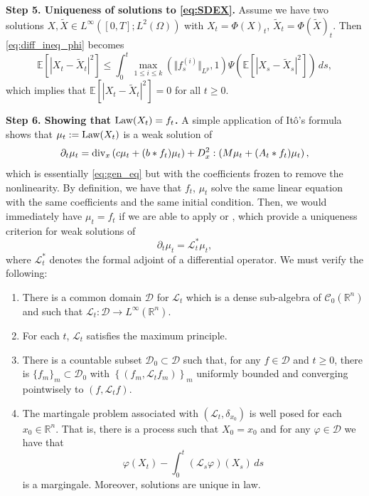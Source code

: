\documentclass[10pt,oneside]{amsart}
\numberwithin{equation}{section}
\numberwithin{definition}{section}
\numberwithin{theorem}{section}
\numberwithin{lemma}{section}
\begin{document}
\textbf{Step 5. Uniqueness of solutions to \cref{eq:SDEX}.} Assume we have two solutions $X,\tilde{X}\in L^{\infty}\left([0,T];L^{2}(\Omega)\right)$ with $X_{t}=\Phi(X)_{t}$, $\tilde{X}_{t}=\Phi(\tilde{X})_{t}$. Then \cref{eq:diff_ineq_phi} becomes
%
\begin{equation*}
  \mathbb{E}\left[|X_{t}-\tilde{X}_{t}|^{2}\right]\leq\int_{0}^{t}\max_{1\leq i\leq k}(\Vert f_{s}^{(i)}\Vert_{L^p},1)\Psi\left(\mathbb{E}\left[|X_{s}-\tilde{X}_{s}|^{2}\right]\right)\,ds,
\end{equation*}
%
which implies that $\mathbb{E}\left[|X_{t}-\tilde{X}_{t}|^{2}\right]=0$ for all $t\geq0$.

\textbf{Step 6. Showing that $\textnormal{Law}(X_t)=f_t$.} A simple application of Itô's formula shows that $\mu_{t}:=\textnormal{Law}(X_{t})$ is a weak solution of
%
\begin{equation*}
  \partial_{t}\mu_{t}=\textnormal{div}_{x}\left(c\mu_{t}+(b*f_{t})\mu_{t}\right)+D_{x}^{2}:\left(M\mu_{t}+(A_{t}*f_{t})\mu_{t}\right),
\end{equation*}
%
which is essentially \cref{eq:gen_eq} but with the coefficients frozen to remove the nonlinearity. By definition, we have that $f_t$, $\mu_t$ solve the same linear equation with the same coefficients and the same initial condition. Then, we would immediately have $\mu_t = f_t$ if we are able to apply \cite[Theorem B.1]{HoroKara1990MartProbBoltz} or \cite[Theorems 4.1 and 5.1]{BhattKara1993InvarMeasures}, which provide a uniqueness criterion for weak solutions of
%
\begin{equation*}
  \partial_t \mu_t = \mathcal L_t^*\mu_t,
\end{equation*}
%
where $\mathcal L_t^*$ denotes the formal adjoint of a differential operator. We must verify the following:
\begin{enumerate}
  \item There is a common domain $\mathcal D$ for $\mathcal L_t$ which is a dense sub-algebra of $\mathcal C_0(\mathbb R^n)$ and such that $\mathcal L_t : \mathcal D\longrightarrow L^\infty(\mathbb R^n)$.
  \item For each $t$, $\mathcal L_t$ satisfies the maximum principle. 
  \item There is a countable subset $\mathcal{D}_{0}\subset\mathcal{D}$ such that, for any $f\in\mathcal{D}$ and $t\geq0$, there is $\{f_{m}\}_{m}\subset\mathcal{D}_{0}$ with $\left\{ (f_{m},\mathcal L_{t}f_{m})\right\} _{m}$ uniformly bounded and converging pointwisely to $(f,\mathcal L_{t}f)$.
  \item The martingale problem associated with $(\mathcal L_t,\delta_{x_0})$ is well posed for each $x_0\in \mathbb R^n$. That is, there is a process such that $X_0 = x_0$ and for any $\varphi\in \mathcal D$ we have that
  \begin{equation}\label{eq:mart_prob}
    \varphi\left(X_{t}\right)-\int_{0}^{t}(\mathcal L_{s}\varphi)(X_{s})\,ds
  \end{equation}
  is a margingale. Moreover, solutions are unique in law.
\end{enumerate}
\end{document}

